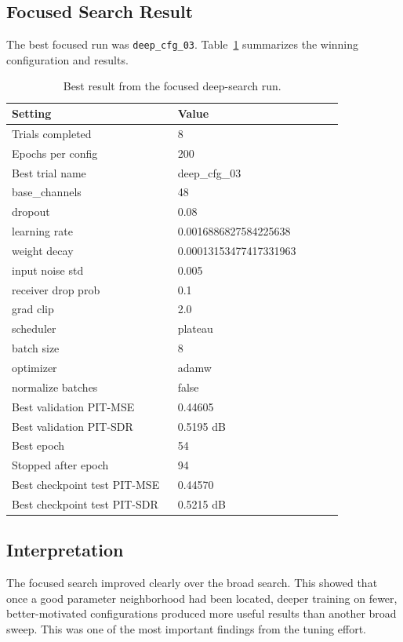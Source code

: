 \documentclass[11pt]{article}
\begin{document}
\subsection{Focused Search Result}
The best focused run was \texttt{deep\_cfg\_03}. Table~\ref{tab:deepcv} summarizes the winning configuration and results.

\begin{table}[htbp]
\centering
\caption{Best result from the focused deep-search run.}
\label{tab:deepcv}
\begin{tabular}{p{0.42\linewidth}p{0.42\linewidth}}
\hline
Setting & Value \\
\hline
Trials completed & 8 \\
Epochs per config & 200 \\
Best trial name & deep\_cfg\_03 \\
base\_channels & 48 \\
dropout & 0.08 \\
learning rate & 0.0016886827584225638 \\
weight decay & 0.00013153477417331963 \\
input noise std & 0.005 \\
receiver drop prob & 0.1 \\
grad clip & 2.0 \\
scheduler & plateau \\
batch size & 8 \\
optimizer & adamw \\
normalize batches & false \\
Best validation PIT-MSE & 0.44605 \\
Best validation PIT-SDR & 0.5195 dB \\
Best epoch & 54 \\
Stopped after epoch & 94 \\
Best checkpoint test PIT-MSE & 0.44570 \\
Best checkpoint test PIT-SDR & 0.5215 dB \\
\hline
\end{tabular}
\end{table}

\subsection{Interpretation}
The focused search improved clearly over the broad search. This showed that once a good parameter neighborhood had been located, deeper training on fewer, better-motivated configurations produced more useful results than another broad sweep. This was one of the most important findings from the tuning effort.
\end{document}
